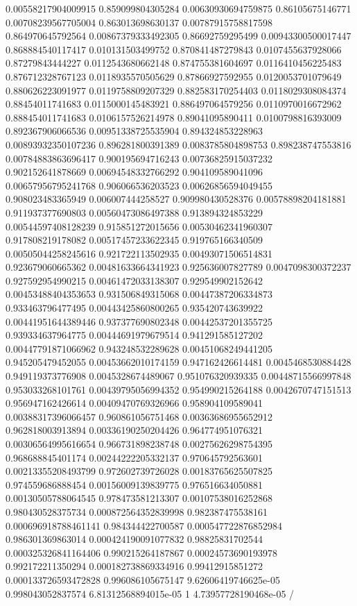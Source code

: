 \begin{table}
\begin{tabu}
\begin{sparkline}{10}
0.00558217904009915 0.859099804305284 0.00630930694759875 0.86105675146771 0.00708239567705004 0.863013698630137 0.00787915758817598 0.864970645792564 0.00867379333492305 0.86692759295499 0.00943300500017447 0.868884540117417 0.010131503499752 0.870841487279843 0.0107455637928066 0.87279843444227 0.0112543680662148 0.874755381604697 0.0116410456225483 0.876712328767123 0.0118935570505629 0.87866927592955 0.0120053701079649 0.880626223091977 0.0119758809207329 0.882583170254403 0.0118029308084374 0.88454011741683 0.0115000145483921 0.886497064579256 0.0110970016672962 0.888454011741683 0.0106157526214978 0.89041095890411 0.0100798816393009 0.892367906066536 0.00951338725535904 0.894324853228963 0.00893932350107236 0.896281800391389 0.0083785804898753 0.898238747553816 0.00784883863696417 0.900195694716243 0.00736825915037232 0.902152641878669 0.00694548332766292 0.904109589041096 0.00657956795241768 0.906066536203523 0.00626856594049455 0.908023483365949 0.006007444258527 0.909980430528376 0.00578898204181881 0.911937377690803 0.00560473086497388 0.913894324853229 0.00544597408128239 0.915851272015656 0.00530462341960307 0.917808219178082 0.00517457233622345 0.919765166340509 0.00505044258245616 0.921722113502935 0.00493071506514831 0.923679060665362 0.00481633664341923 0.925636007827789 0.0047098300372237 0.927592954990215 0.00461472033138307 0.929549902152642 0.00453488404353653 0.931506849315068 0.00447387206334873 0.933463796477495 0.00443425860800265 0.935420743639922 0.00441951644389446 0.937377690802348 0.00442537201355725 0.939334637964775 0.00444691979679514 0.941291585127202 0.00447791871066962 0.943248532289628 0.00451068249441205 0.945205479452055 0.00453662010174159 0.947162426614481 0.0045468530884428 0.949119373776908 0.0045328674489067 0.951076320939335 0.00448715566997848 0.953033268101761 0.00439795056994352 0.954990215264188 0.0042670747151513 0.956947162426614 0.00409470769326966 0.958904109589041 0.00388317396066457 0.960861056751468 0.00363686955652912 0.962818003913894 0.00336190250204426 0.964774951076321 0.00306564995616654 0.966731898238748 0.00275626298754395 0.968688845401174 0.00244222205332137 0.970645792563601 0.00213355208493799 0.972602739726028 0.00183765625507825 0.974559686888454 0.00156009139839775 0.976516634050881 0.00130505788064545 0.978473581213307 0.00107538016252868 0.980430528375734 0.000872564352839998 0.982387475538161 0.000696918788461141 0.984344422700587 0.000547722876852984 0.986301369863014 0.000424190091077832 0.98825831702544 0.000325326841164406 0.990215264187867 0.00024573690193978 0.992172211350294 0.000182738869334916 0.99412915851272 0.000133726593472828 0.996086105675147 9.62606419746625e-05 0.998043052837574 6.81312568894015e-05 1 4.73957728190468e-05 /

\end{sparkline}
\end{tabu}
\end{table}
